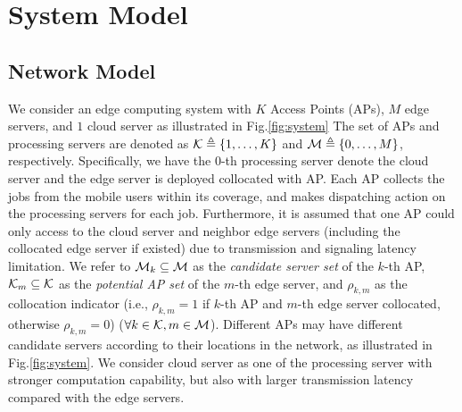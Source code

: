 \section{System Model}
\label{sec:model}

\subsection{Network Model}
We consider an edge computing system with $K$ Access Points (APs), $M$ edge servers, and $1$ cloud server as illustrated in Fig.\ref{fig:system}
The set of APs and processing servers are denoted as $\mathcal{K} \triangleq \{1,\dots,K\}$ and $\mathcal{M} \triangleq \{0,\dots,M\}$, respectively.
Specifically, we have the $0$-th processing server denote the cloud server and the edge server is deployed collocated with AP.
Each AP collects the jobs from the mobile users within its coverage, and makes dispatching action on the processing servers for each job.
Furthermore, it is assumed that one AP could only access to the cloud server and neighbor edge servers (including the collocated edge server if existed) due to transmission and signaling latency limitation.
We refer to $\mathcal{M}_{k} \subseteq \mathcal{M}$ as the \emph{candidate server set} of the $k$-th AP,  $\mathcal{K}_{m} \subseteq \mathcal{K}$ as the \emph{potential AP set} of the $m$-th edge server, and $\rho_{k,m}$ as the collocation indicator (i.e., $\rho_{k,m}=1$ if $k$-th AP and $m$-th edge server collocated, otherwise $\rho_{k,m}=0$) ($\forall k\in\mathcal{K}, m\in\mathcal{M}$).
Different APs may have different candidate servers according to their locations in the network, as illustrated in Fig.\ref{fig:system}.
We consider cloud server as one of the processing server with stronger computation capability, but also with larger transmission latency compared with the edge servers.

